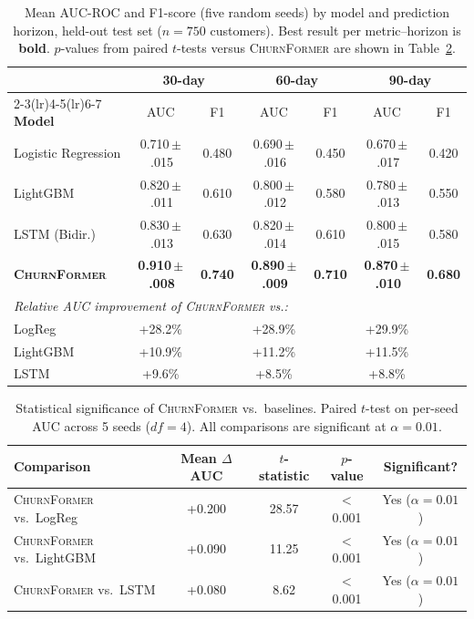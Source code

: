 \documentclass[review, 12pt]{elsarticle}
\newcommand{\model}{\textsc{ChurnFormer}}
\begin{document}
\begin{table}[H]
  \centering
  \caption{Mean AUC-ROC and F1-score (five random seeds) by model and
    prediction horizon, held-out test set ($n = 750$ customers).
    Best result per metric--horizon is \textbf{bold}.
    $p$-values from paired $t$-tests versus \model{} are shown in
    Table~\ref{tab:significance}.}
  \label{tab:results}
  \small
  \setlength{\tabcolsep}{6pt}
  \begin{tabular}{lcccccc}
    \toprule
    & \multicolumn{2}{c}{\textbf{30-day}} &
      \multicolumn{2}{c}{\textbf{60-day}} &
      \multicolumn{2}{c}{\textbf{90-day}} \\
    \cmidrule(lr){2-3}\cmidrule(lr){4-5}\cmidrule(lr){6-7}
    \textbf{Model} & AUC & F1 & AUC & F1 & AUC & F1 \\
    \midrule
    Logistic Regression
      & 0.710\,$\pm$\,.015 & 0.480 & 0.690\,$\pm$\,.016 & 0.450 & 0.670\,$\pm$\,.017 & 0.420 \\
    LightGBM \cite{ke2017}
      & 0.820\,$\pm$\,.011 & 0.610 & 0.800\,$\pm$\,.012 & 0.580 & 0.780\,$\pm$\,.013 & 0.550 \\
    LSTM (Bidir.)
      & 0.830\,$\pm$\,.013 & 0.630 & 0.820\,$\pm$\,.014 & 0.610 & 0.800\,$\pm$\,.015 & 0.580 \\
    \textbf{\model{}}
      & \textbf{0.910\,$\pm$\,.008} & \textbf{0.740}
      & \textbf{0.890\,$\pm$\,.009} & \textbf{0.710}
      & \textbf{0.870\,$\pm$\,.010} & \textbf{0.680} \\
    \midrule
    \multicolumn{7}{l}{\textit{Relative AUC improvement of \model{} vs.:}} \\
    \quad LogReg   & +28.2\% && +28.9\% && +29.9\% & \\
    \quad LightGBM & +10.9\% && +11.2\% && +11.5\% & \\
    \quad LSTM     & +9.6\%  && +8.5\%  && +8.8\%  & \\
    \bottomrule
  \end{tabular}
\end{table}

\begin{table}[H]
  \centering
  \caption{Statistical significance of \model{} vs.\ baselines.
    Paired $t$-test on per-seed AUC across 5 seeds ($df = 4$).
    All comparisons are significant at $\alpha = 0.01$.}
  \label{tab:significance}
  \small
  \begin{tabular}{lcccc}
    \toprule
    \textbf{Comparison} &
      \textbf{Mean $\Delta$AUC} & \textbf{$t$-statistic} &
      \textbf{$p$-value} & \textbf{Significant?} \\
    \midrule
    \model{} vs.\ LogReg   & +0.200 & 28.57 & $<$0.001 & Yes ($\alpha = 0.01$) \\
    \model{} vs.\ LightGBM & +0.090 & 11.25 & $<$0.001 & Yes ($\alpha = 0.01$) \\
    \model{} vs.\ LSTM     & +0.080 &  8.62 & $<$0.001 & Yes ($\alpha = 0.01$) \\
    \bottomrule
  \end{tabular}
\end{table}
\end{document}
